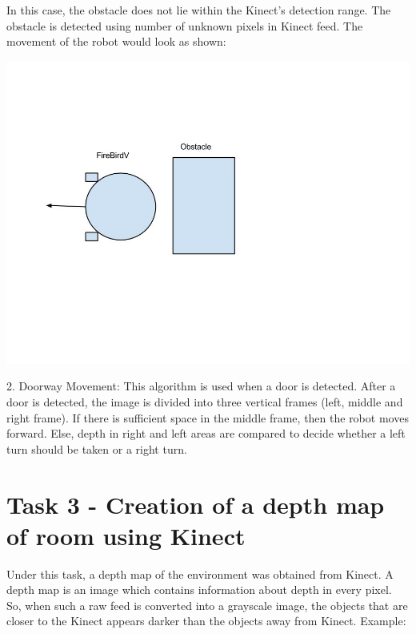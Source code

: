\documentclass{report}
\begin{document}
In this case, the obstacle does not lie within the Kinect's detection range. 
The obstacle is detected using number of unknown pixels in Kinect feed. The movement of the robot would look as shown:
\begin{flushleft}
\includegraphics[width = 18CM]{Case_2.jpg}
\end{flushleft}

2. Doorway Movement:
This algorithm is used when a door is detected. After a door is detected, 
the image is divided into three vertical frames (left, middle and right frame). 
If there is sufficient space in the middle frame, then the robot moves forward. Else, 
depth in right and left areas are compared to decide whether a left turn should be taken or a right turn.

\section{Task 3 - Creation of a depth map of room using Kinect}
Under this task, a depth map of the environment was obtained from Kinect. A depth map is an image which contains information about
depth in every pixel. So, when such a raw feed is converted into a grayscale image, the objects that are closer to the Kinect appears darker
than the objects away from Kinect. Example: \\
\end{document}
